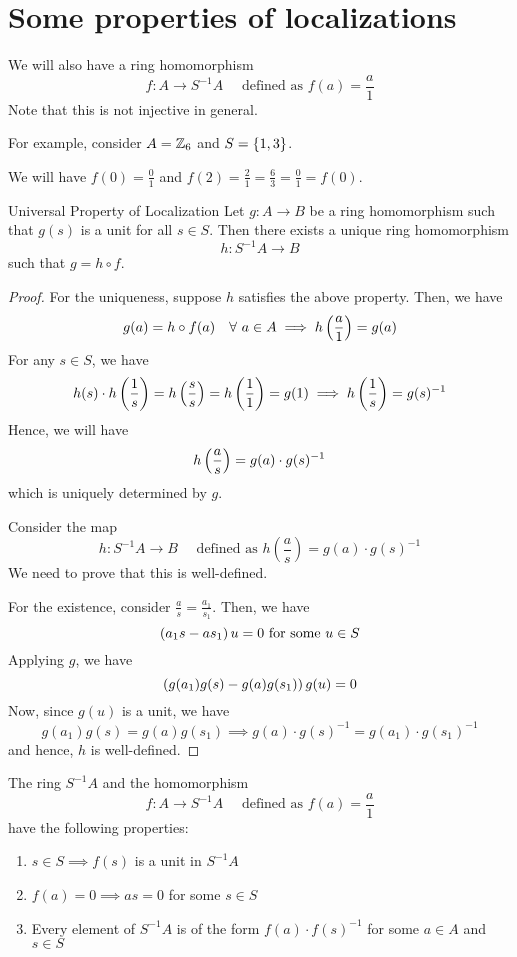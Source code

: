 \section{Some properties of localizations}

We will also have a ring homomorphism
\[
	f \colon A \to S^{-1}A \quad \text{ defined as }
	f(a) = \frac{a}{1}
\]
Note that this is not injective in general.

For example, consider \(A = \ZZ_6\) and \(S = \left\{ 1, 3 \right\}\).

We will have \(f(0) = \frac{0}{1}\) and
\(f(2) = \frac{2}{1} = \frac{6}{3} = \frac{0}{1} = f(0)\).

\begin{proposition}{Universal Property of Localization}{}
	Let \(g \colon A \to B\) be a ring homomorphism such that
	\(g(s)\) is a unit for all \(s \in S\).
	Then there exists a unique ring homomorphism
	\[
		h \colon S^{-1}A \to B
	\]
	such that \(g = h \circ f\).
\end{proposition}

\begin{proof}
	For the uniqueness, suppose \(h\) satisfies the above property.
	Then, we have
	\[
		g(a) = h \circ f(a) \quad \forall\ a \in A
		\implies h\left( \frac{a}{1} \right) = g(a)
	\]
	For any \(s \in S\), we have
	\[
		h(s) \cdot h \left( \frac{1}{s} \right) =
		h \left( \frac{s}{s} \right) = h \left( \frac{1}{1} \right) = g(1)
		\implies h \left( \frac{1}{s} \right) = g(s)^{-1}
	\]
	Hence, we will have
	\[
		h\left( \frac{a}{s} \right) = g(a) \cdot g(s)^{-1}
	\]
	which is uniquely determined by \(g\).


	Consider the map
	\[
		h \colon S^{-1}A \to B \quad \text{ defined as }
		h\left(\frac{a}{s}\right) = g(a) \cdot g(s)^{-1}
	\]
	We need to prove that this is well-defined.

	For the existence, consider \(\frac{a}{s} = \frac{a_1}{s_1}\).
	Then, we have
	\[
		\left( a_1 s - a s_1 \right)u = 0 \text{ for some } u \in S
	\]
	Applying \(g\), we have
	\[
		\left( g(a_1) g(s) - g(a) g(s_1) \right) g(u) = 0
	\]
	Now, since \(g(u)\) is a unit, we have
	\[
		g(a_1) g(s) = g(a) g(s_1)
		\implies g(a) \cdot g(s)^{-1} = g(a_1) \cdot g(s_1)^{-1}
	\]
	and hence, \(h\) is well-defined.
\end{proof}


\begin{proposition}{}{}
	The ring \(S^{-1}A\) and the homomorphism
	\[
		f \colon A \to S^{-1}A \quad \text{ defined as }
		f(a) = \frac{a}{1}
	\]
	have the following properties:
	\begin{enumerate}
		\item \(s \in S \implies f(s)\) is a unit in \(S^{-1}A\)
		\item \(f(a) = 0 \implies as = 0\) for some \(s \in S\)
		\item Every element of \(S^{-1}A\) is of the form
			\(f(a) \cdot f(s)^{-1}\) for some \(a \in A\) and
			\(s \in S\)
	\end{enumerate}
\end{proposition}

